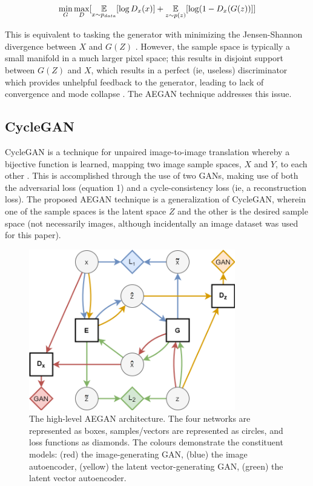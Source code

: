 \documentclass{article}
\begin{document}
\begin{equation}
\min_{G}\max_{D}[\operatorname*{\mathbb{E}}_{x \sim p_{data}}[\log D_{x}(x)] + \operatorname*{\mathbb{E}}_{z \sim p(z)}[\log (1 - D_{x}(G(z))]]
\end{equation}

This is equivalent to tasking the generator with minimizing the Jensen-Shannon divergence between $X$ and $G(Z)$ \cite{goodfellow2014generative}. However, the sample space is typically a small manifold in a much larger pixel space; this results in disjoint support between $G(Z)$ and $X$, which results in a perfect (ie, useless) discriminator which provides unhelpful feedback to the generator, leading to lack of convergence and mode collapse \cite{roth2017}. The AEGAN technique addresses this issue.

\subsection{CycleGAN}
CycleGAN is a technique for unpaired image-to-image translation whereby a bijective function is learned, mapping two image sample spaces, $X$ and $Y$, to each other \cite{zhu2017unpaired}. This is accomplished through the use of two GANs, making use of both the adversarial loss (equation 1) and a cycle-consistency loss (ie, a reconstruction loss). The proposed AEGAN technique is a generalization of CycleGAN, wherein one of the sample spaces is the latent space $Z$ and the other is the desired sample space (not necessarily images, although incidentally an image dataset was used for this paper).

\begin{figure}[t] %
    \centering
    \includegraphics[width=9cm]{aegan.png}
    \caption{The high-level AEGAN architecture. The four networks are represented as boxes, samples/vectors are represented as circles, and loss functions as diamonds. The colours demonstrate the constituent models: (red) the image-generating GAN, (blue) the image autoencoder, (yellow) the latent vector-generating GAN, (green) the latent vector autoencoder.}
    \label{fig:network}
\end{figure}
\end{document}
